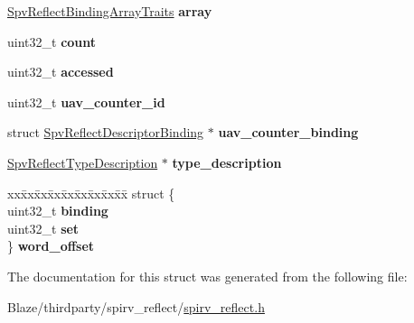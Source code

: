 \begin{DoxyCompactItemize}
\item 
\mbox{\label{structSpvReflectDescriptorBinding_a3a04b414132f2e4b21e348ca1328e22c}} 
\hyperlink{structSpvReflectBindingArrayTraits}{Spv\+Reflect\+Binding\+Array\+Traits} {\bfseries array}
\item 
\mbox{\label{structSpvReflectDescriptorBinding_aab66f042b11ad0c085140d866caaef88}} 
uint32\+\_\+t {\bfseries count}
\item 
\mbox{\label{structSpvReflectDescriptorBinding_a04b02074d48167b0039e170e5c826410}} 
uint32\+\_\+t {\bfseries accessed}
\item 
\mbox{\label{structSpvReflectDescriptorBinding_a424b99c33348b8267e882ea888050b79}} 
uint32\+\_\+t {\bfseries uav\+\_\+counter\+\_\+id}
\item 
\mbox{\label{structSpvReflectDescriptorBinding_acae4325a0ad44e6827694d8d7fc53b4d}} 
struct \hyperlink{structSpvReflectDescriptorBinding}{Spv\+Reflect\+Descriptor\+Binding} $\ast$ {\bfseries uav\+\_\+counter\+\_\+binding}
\item 
\mbox{\label{structSpvReflectDescriptorBinding_a31bc3d34852b65f72c789fe0afd9e6ee}} 
\hyperlink{structSpvReflectTypeDescription}{Spv\+Reflect\+Type\+Description} $\ast$ {\bfseries type\+\_\+description}
\item 
\mbox{\label{structSpvReflectDescriptorBinding_ad06526b9130029cbfb2bb69bd3ce16c2}} 
\begin{tabbing}
xx\=xx\=xx\=xx\=xx\=xx\=xx\=xx\=xx\=\kill
struct \{\\
\>uint32\_t {\bfseries binding}\\
\>uint32\_t {\bfseries set}\\
\} {\bfseries word\_offset}\\

\end{tabbing}\end{DoxyCompactItemize}


The documentation for this struct was generated from the following file\+:\begin{DoxyCompactItemize}
\item 
Blaze/thirdparty/spirv\+\_\+reflect/\hyperlink{spirv__reflect_8h}{spirv\+\_\+reflect.\+h}\end{DoxyCompactItemize}
